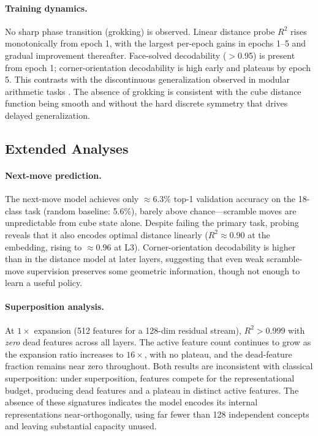 \documentclass[12pt]{article}
\begin{document}
\paragraph{Training dynamics.}
No sharp phase transition (grokking) is observed.  Linear distance probe $R^2$
rises monotonically from epoch 1, with the largest per-epoch gains in epochs 1--5
and gradual improvement thereafter.  Face-solved decodability ($>$0.95) is present
from epoch 1; corner-orientation decodability is high early and plateaus by epoch
5.  This contrasts with the discontinuous generalization observed in modular
arithmetic tasks \cite{power2022grokking}.  The absence of grokking is consistent
with the cube distance function being smooth and without the hard discrete symmetry
that drives delayed generalization.

\subsection{Extended Analyses}

\paragraph{Next-move prediction.}
The next-move model achieves only ${\approx}6.3\%$ top-1 validation accuracy on
the 18-class task (random baseline: 5.6\%), barely above chance---scramble
moves are unpredictable from cube state alone.  Despite failing the primary
task, probing reveals that it also encodes optimal distance linearly
($R^2 \approx 0.90$ at the embedding, rising to $\approx 0.96$ at L3).
Corner-orientation decodability is higher than in the distance model at later
layers, suggesting that even weak scramble-move supervision preserves some geometric
information, though not enough to learn a useful policy.

\paragraph{Superposition analysis.}
At $1\times$ expansion (512 features for a 128-dim residual stream), $R^2 >
0.999$ with \emph{zero} dead features across all layers.  The active feature count
continues to grow as the expansion ratio increases to $16\times$, with no plateau,
and the dead-feature fraction remains near zero throughout.  Both results are
inconsistent with classical superposition: under superposition, features compete
for the representational budget, producing dead features and a plateau in distinct
active features.  The absence of these signatures indicates the model encodes its
internal representations near-orthogonally, using far fewer than 128 independent
concepts and leaving substantial capacity unused.
\end{document}
